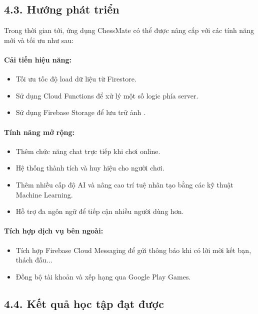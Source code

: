 \documentclass[a4paper,12pt]{article}
\begin{document}
\subsection*{4.3. Hướng phát triển} %

\justify
\noindent Trong thời gian tới, ứng dụng ChessMate có thể được nâng cấp với các tính năng mới và tối ưu như sau:

\paragraph{\textbf{Cải tiến hiệu năng:}} %
\begin{itemize}[label=·]
    \item Tối ưu tốc độ load dữ liệu từ Firestore.
    \item Sử dụng Cloud Functions để xử lý một số logic phía server.
    \item Sử dụng Firebase Storage để lưu trữ ảnh .
\end{itemize}

\paragraph{\textbf{Tính năng mở rộng:}} %
\begin{itemize}[label=·]
    \item Thêm chức năng chat trực tiếp khi chơi online.
    \item Hệ thống thành tích và huy hiệu cho người chơi.
    \item Thêm nhiều cấp độ AI và nâng cao trí tuệ nhân tạo bằng các kỹ thuật Machine Learning.
    \item Hỗ trợ đa ngôn ngữ để tiếp cận nhiều người dùng hơn.
\end{itemize}

\paragraph{\textbf{Tích hợp dịch vụ bên ngoài:}} %
\begin{itemize}[label=·]
    \item Tích hợp Firebase Cloud Messaging để gửi thông báo khi có lời mời kết bạn, thách đấu...
    \item Đồng bộ tài khoản và xếp hạng qua Google Play Games.
\end{itemize}

\subsection*{4.4. Kết quả học tập đạt được} %
\end{document}
